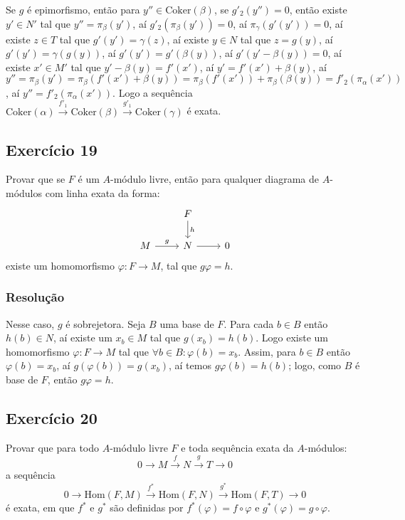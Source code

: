 \documentclass[10pt,a4paper]{article}
\begin{document}
\medskip
\noindent
Se $g$ é epimorfismo, então para $y''\in\mathrm{Coker}(\beta)$, se $g'_2(y'')=0$, então existe $y'\in N'$ tal que $y''=\pi_\beta(y')$, aí $g'_2(\pi_\beta(y'))=0$, aí $\pi_\gamma(g'(y'))=0$, aí existe $z\in T$ tal que $g'(y')=\gamma(z)$, aí existe $y\in N$ tal que $z=g(y)$, aí $g'(y')=\gamma(g(y))$, aí $g'(y')=g'(\beta(y))$, aí $g'(y'-\beta(y))=0$, aí existe $x'\in M'$ tal que $y'-\beta(y)=f'(x')$, aí $y'=f'(x')+\beta(y)$, aí $y''=\pi_\beta(y')=\pi_\beta(f'(x')+\beta(y))=\pi_\beta(f'(x'))+\pi_\beta(\beta(y))=f'_2(\pi_\alpha(x'))$, aí $y''=f'_2(\pi_\alpha(x'))$. Logo a sequência $\mathrm{Coker}(\alpha)\xrightarrow{f'_1}\mathrm{Coker}(\beta)\xrightarrow{g'_1}\mathrm{Coker}(\gamma)$ é exata.

\subsection*{Exercício 19}

Provar que se $F$ é um $A$-módulo livre, então para qualquer diagrama de $A$-módulos com linha exata da forma:
\[
\begin{tikzcd}
                 & F \arrow{d}{h} &   \\
M \arrow{r}{g} & N \arrow{r}      & 0
\end{tikzcd}
\]
existe um homomorfismo $\varphi:F\rightarrow M$, tal que $g\varphi=h$.

\subsubsection*{Resolução}

Nesse caso, $g$ é sobrejetora. Seja $B$ uma base de $F$. Para cada $b\in B$ então $h(b)\in N$, aí existe um $x_b\in M$ tal que $g(x_b)=h(b)$. Logo existe um homomorfismo $\varphi:F\rightarrow M$ tal que $\forall b\in B:\varphi(b)=x_b$. Assim, para $b\in B$ então $\varphi(b)=x_b$, aí $g(\varphi(b))=g(x_b)$, aí temos $g\varphi(b)=h(b)$; logo, como $B$ é base de $F$, então $g\varphi=h$.

\subsection*{Exercício 20}

Provar que para todo $A$-módulo livre $F$ e toda sequência exata da $A$-módulos:
\[
0\rightarrow M\xrightarrow{f}N\xrightarrow{g}T\rightarrow 0
\]
a sequência
\[
0\rightarrow\mathrm{Hom}(F,M)\xrightarrow{f^*}\mathrm{Hom}(F,N)\xrightarrow{g^*}\mathrm{Hom}(F,T)\rightarrow 0
\]
é exata, em que $f^*$ e $g^*$ são definidas por $f^*(\varphi)=f\circ\varphi$ e $g^*(\varphi)=g\circ\varphi$.
\end{document}
